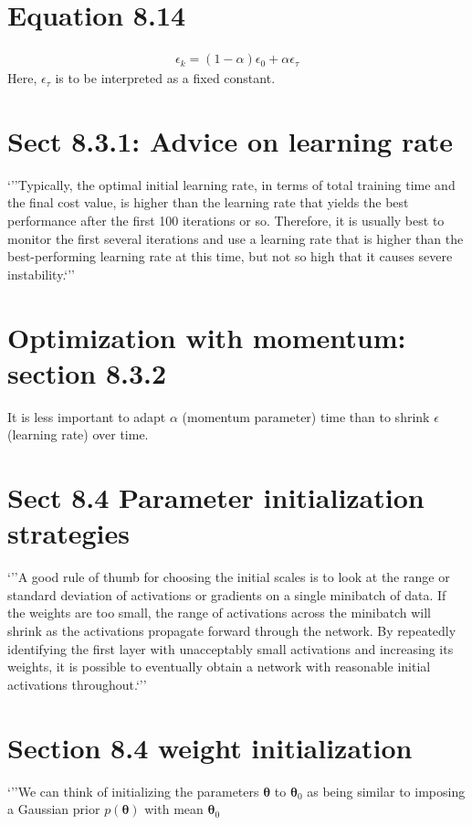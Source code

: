 \documentclass{article}
\newcommand{\ber}{\begin{eqnarray}}
\newcommand{\eer}{\end{eqnarray}}
\begin{document}
%
%
%
\section{Equation 8.14}
\ber
\epsilon_k = (1-\alpha)\epsilon_0 + \alpha\epsilon_{\tau}
\eer
Here, $\epsilon_{\tau}$ is to be interpreted as a fixed constant.

\section{Sect 8.3.1: Advice on learning rate}
`''Typically, the optimal initial learning rate, in terms of total training time and the
ﬁnal cost value, is higher than the learning rate that yields the best performance
after the ﬁrst 100 iterations or so. Therefore, it is usually best to monitor the ﬁrst
several iterations and use a learning rate that is higher than the best-performing
learning rate at this time, but not so high that it causes severe instability.`''
%
%
%
\section{Optimization with momentum: section 8.3.2}
It is less important to adapt $\alpha$ (momentum parameter) time than to shrink $\epsilon$ (learning rate)  over time.


%
%
%

\section{Sect 8.4 Parameter initialization strategies}
`''A good rule of thumb for choosing the initial scales is to
look at the range or standard deviation of activations or gradients on a single
minibatch of data. If the weights are too small, the range of activations across the
minibatch will shrink as the activations propagate forward through the network.
By repeatedly identifying the first layer with unacceptably small activations and
increasing its weights, it is possible to eventually obtain a network with reasonable
initial activations throughout.`''

%
%
%

\section{Section 8.4 weight initialization}
`''We can think of initializing the parameters $\pmb{\theta}$ to $\pmb{\theta}_0$ as being similar to imposing a Gaussian prior $p(\pmb{\theta})$ with mean $\pmb{\theta}_0$
%
%
%
\end{document}
